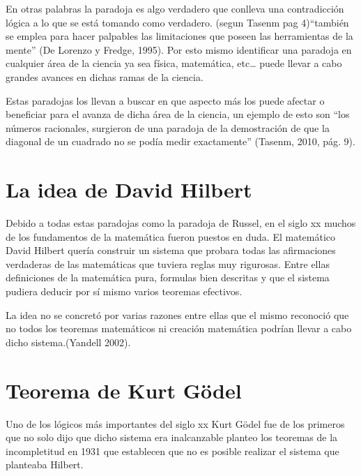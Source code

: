 \documentclass{article}
\begin{document}
\vspace{10pt}
 En otras palabras la paradoja es algo verdadero que conlleva una contradicción lógica a lo que se está tomando como verdadero. (segun Tasenm pag 4)“también se emplea para hacer palpables las limitaciones que poseen las herramientas de la mente” (De Lorenzo y Fredge, 1995). Por esto mismo identificar una paradoja en cualquier área de la ciencia ya sea física, matemática, etc… puede llevar a cabo grandes avances en dichas ramas de la ciencia.

\vspace{10pt}

Estas paradojas los llevan a buscar en que aspecto más los puede afectar o beneficiar para el avanza de dicha área de la ciencia, un ejemplo de esto son “los números racionales, surgieron de una paradoja de la demostración de  que la diagonal de un cuadrado no se podía medir exactamente” (Tasenm, 2010, pág. 9).
\vspace{10pt}

\section{La idea de David Hilbert}
Debido a todas estas paradojas como la paradoja de Russel, en el siglo xx muchos de los fundamentos de la matemática fueron puestos en duda. El matemático David Hilbert quería construir un sistema que probara todas las afirmaciones verdaderas  de las matemáticas que tuviera reglas muy rigurosas. Entre ellas definiciones de la matemática pura, formulas bien descritas y que el sistema pudiera deducir por sí mismo varios teoremas efectivos.

\vspace{10pt}

La idea no se concretó por varias razones entre ellas que el mismo reconoció que no todos los teoremas matemáticos ni creación matemática podrían llevar a cabo dicho sistema.(Yandell 2002).

\vspace{10pt}
\section{Teorema de Kurt Gödel}
Uno de los lógicos más importantes del siglo xx Kurt Gödel fue de los primeros que no solo dijo que dicho sistema era inalcanzable planteo los teoremas de la incompletitud en 1931 que establecen que no es posible realizar el sistema que planteaba Hilbert.
\vspace{10pt}
\end{document}
